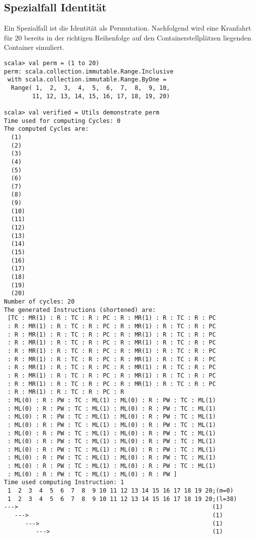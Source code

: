 \subsection{Spezialfall Identität}
Ein Spezialfall ist die Identität als Permutation.
Nachfolgend wird eine Kranfahrt für 20 bereits in der richtigen Reihenfolge auf den Containerstellplätzen liegenden Container simuliert.
\begin{lstlisting}
scala> val perm = (1 to 20)                   
perm: scala.collection.immutable.Range.Inclusive
 with scala.collection.immutable.Range.ByOne =
  Range( 1,  2,  3,  4,  5,  6,  7,  8,  9, 10,
        11, 12, 13, 14, 15, 16, 17, 18, 19, 20)

scala> val verified = Utils demonstrate perm
Time used for computing Cycles: 0
The computed Cycles are: 
  (1)
  (2)
  (3)
  (4)
  (5)
  (6)
  (7)
  (8)
  (9)
  (10)
  (11)
  (12)
  (13)
  (14)
  (15)
  (16)
  (17)
  (18)
  (19)
  (20)
Number of cycles: 20
The generated Instructions (shortened) are: 
 [TC : MR(1) : R : TC : R : PC : R : MR(1) : R : TC : R : PC
 : R : MR(1) : R : TC : R : PC : R : MR(1) : R : TC : R : PC
 : R : MR(1) : R : TC : R : PC : R : MR(1) : R : TC : R : PC
 : R : MR(1) : R : TC : R : PC : R : MR(1) : R : TC : R : PC
 : R : MR(1) : R : TC : R : PC : R : MR(1) : R : TC : R : PC
 : R : MR(1) : R : TC : R : PC : R : MR(1) : R : TC : R : PC
 : R : MR(1) : R : TC : R : PC : R : MR(1) : R : TC : R : PC
 : R : MR(1) : R : TC : R : PC : R : MR(1) : R : TC : R : PC
 : R : MR(1) : R : TC : R : PC : R : MR(1) : R : TC : R : PC
 : R : MR(1) : R : TC : R : PC : R
 : ML(0) : R : PW : TC : ML(1) : ML(0) : R : PW : TC : ML(1) 
 : ML(0) : R : PW : TC : ML(1) : ML(0) : R : PW : TC : ML(1)
 : ML(0) : R : PW : TC : ML(1) : ML(0) : R : PW : TC : ML(1)
 : ML(0) : R : PW : TC : ML(1) : ML(0) : R : PW : TC : ML(1)
 : ML(0) : R : PW : TC : ML(1) : ML(0) : R : PW : TC : ML(1)
 : ML(0) : R : PW : TC : ML(1) : ML(0) : R : PW : TC : ML(1)
 : ML(0) : R : PW : TC : ML(1) : ML(0) : R : PW : TC : ML(1)
 : ML(0) : R : PW : TC : ML(1) : ML(0) : R : PW : TC : ML(1)
 : ML(0) : R : PW : TC : ML(1) : ML(0) : R : PW : TC : ML(1)
 : ML(0) : R : PW : TC : ML(1) : ML(0) : R : PW ] 
Time used computing Instruction: 1
 1  2  3  4  5  6  7  8  9 10 11 12 13 14 15 16 17 18 19 20;(m=0)
 1  2  3  4  5  6  7  8  9 10 11 12 13 14 15 16 17 18 19 20;(l=38)
--->                                                       (1)
   --->                                                    (1)
      --->                                                 (1)
         --->                                              (1)

\end{lstlisting}
